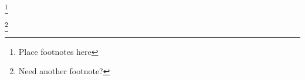\label{app:A}
\setcounter{table}{0} \renewcommand{\thetable}{\Alph{section}.\arabic{table}}
\setcounter{figure}{0} \renewcommand{\thefigure}{\Alph{section}.\arabic{figure}}
\setcounter{footnote}{0} \renewcommand{\thefootnote}{\Alph{section}\roman{footnote}}




        \footnote{Place footnotes here}

        \footnote{Need another footnote?}
